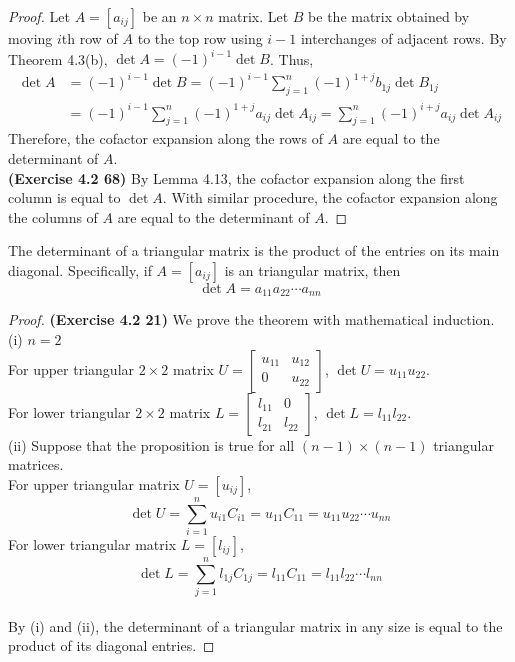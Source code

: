 \begin{proof}
	Let $A = [a_{ij}]$ be an $n \times n$ matrix. Let $B$ be the matrix obtained by moving $i$th row of $A$ to the top row using $i-1$ interchanges of adjacent rows. By Theorem 4.3(b), $\det A = (-1)^{i-1} \det B$.
	Thus,
	\begin{align*}
		\det A &= (-1)^{i-1} \det B = (-1)^{i-1} \sum_{j=1}^{n} (-1)^{1+j} b_{1j} \det B_{1j} \\
		&= (-1)^{i-1} \sum_{j=1}^{n} (-1)^{1+j} a_{ij} \det A_{ij} = \sum_{j=1}^{n} (-1)^{i+j} a_{ij} \det A_{ij}
	\end{align*}
	Therefore, the cofactor expansion along the rows of $A$ are equal to the determinant of $A$. \\
	
	\textbf{(Exercise 4.2 68)} By Lemma 4.13, the cofactor expansion along the first column is equal to $\det{A}$. With similar procedure, the cofactor expansion along the columns of $A$ are equal to the determinant of $A$.
\end{proof}

\begin{theorem}
	The determinant of a triangular matrix is the product of the entries on its main diagonal. Specifically, if $ A=\left[a_{ij}\right] $ is an \nbyn triangular matrix, then $$ \det A = a_{11}a_{22}\cdots a_{nn} $$
\end{theorem}
\begin{proof}
	\textbf{(Exercise 4.2 21)} We prove the theorem with mathematical induction. \\
	
	(i) $n = 2$ \\
	For upper triangular $2 \times 2$ matrix $U = \begin{bmatrix}
		u_{11} & u_{12} \\ 0 & u_{22}
	\end{bmatrix}$, $\det{U} = u_{11}u_{22}$. \\
	For lower triangular $2 \times 2$ matrix $L = \begin{bmatrix}
		l_{11} & 0 \\ l_{21} & l_{22}
	\end{bmatrix}$, $\det{L} = l_{11}l_{22}$. \\
	
	(ii) Suppose that the proposition is true for all $(n-1) \times (n-1)$ triangular matrices. \\
	For \nbyn upper triangular matrix $U = [u_{ij}]$,
	\begin{equation*}
		\det{U} = \sum_{i=1}^{n}u_{i1}C_{i1} = u_{11}C_{11} = u_{11}u_{22}\cdots u_{nn}
	\end{equation*}
	For \nbyn lower triangular matrix $L = [l_{ij}]$,
	\begin{equation*}
		\det{L} = \sum_{j=1}^{n}l_{1j}C_{1j} = l_{11}C_{11} = l_{11}l_{22}\cdots l_{nn}
	\end{equation*} \\
	
	By (i) and (ii), the determinant of a triangular matrix in any size is equal to the product of its diagonal entries.
\end{proof}

